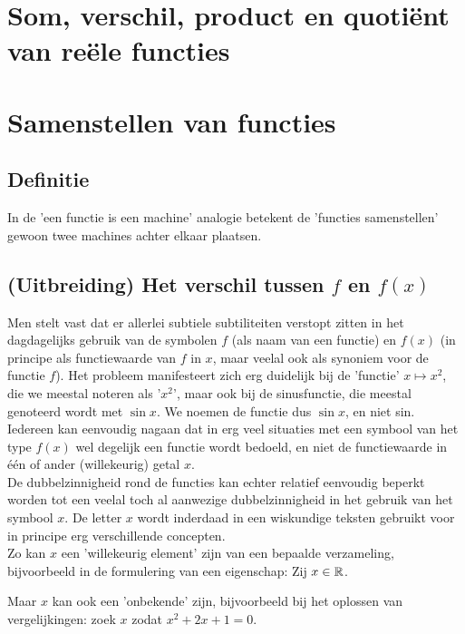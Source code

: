 \documentclass{ximera}
\begin{document}
\section{Som, verschil, product en quotiënt van reële functies}




\section{Samenstellen van functies}

\subsection{Definitie}
In de 'een functie is een machine' analogie betekent de 'functies samenstellen' gewoon twee machines achter elkaar plaatsen. 


\subsection{(Uitbreiding) Het verschil tussen $f$ en $f(x)$}

Men stelt vast dat er allerlei subtiele subtiliteiten verstopt zitten in het dagdagelijks gebruik van de symbolen $f$ (als naam van een functie) en $f(x)$ (in principe als functiewaarde van $f$ in $x$, maar veelal ook als synoniem voor de functie $f$). Het probleem manifesteert zich erg duidelijk bij de 'functie' $x\mapsto x^2$, die we meestal noteren als '$x^2$', maar ook bij de sinusfunctie, die meestal genoteerd wordt met $\sin x$. We noemen de functie dus $\sin x$, en niet sin. Iedereen kan eenvoudig nagaan dat in erg veel situaties met een symbool van het type $f(x)$ wel degelijk een functie wordt bedoeld, en niet de functiewaarde in één of ander (willekeurig) getal $x$.
\\

De dubbelzinnigheid rond de functies kan echter relatief eenvoudig beperkt worden tot een veelal toch al aanwezige dubbelzinnigheid in het gebruik van het symbool $x$. De letter $x$ wordt inderdaad in een wiskundige teksten gebruikt voor in principe erg verschillende concepten. 
\\

Zo kan $x$ een 'willekeurig element' zijn van een bepaalde verzameling, bijvoorbeeld in de formulering van een eigenschap: Zij $x\in\mathbb{R}$.

Maar $x$ kan ook een 'onbekende' zijn, bijvoorbeeld bij het oplossen van vergelijkingen: zoek $x$ zodat $x^2+2x+1=0$. 
\end{document}
